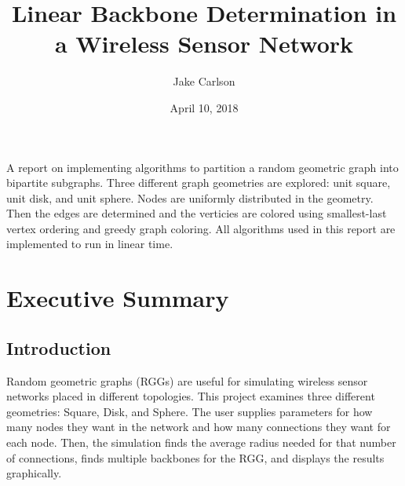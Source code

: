 \documentclass{article}
\begin{document}
\title{Linear Backbone Determination in a Wireless Sensor Network}
\author{Jake Carlson}
\date{April 10, 2018}
\maketitle

\abstract
A report on implementing algorithms to partition a random geometric graph into bipartite subgraphs. Three different graph geometries are explored: unit square, unit disk, and unit sphere. Nodes are uniformly distributed in the geometry. Then the edges are determined and the verticies are colored using smallest-last vertex ordering and greedy graph coloring. All algorithms used in this report are implemented to run in linear time.
\newpage

\tableofcontents
\lstlistoflistings
\newpage

\section{Executive Summary}

    \subsection{Introduction}
    Random geometric graphs (RGGs) are useful for simulating wireless sensor networks placed in different topologies. This project examines three different geometries: Square, Disk, and Sphere. The user supplies parameters for how many nodes they want in the network and how many connections they want for each node. Then, the simulation finds the average radius needed for that number of connections, finds multiple backbones for the RGG, and displays the results graphically.
\end{document}
